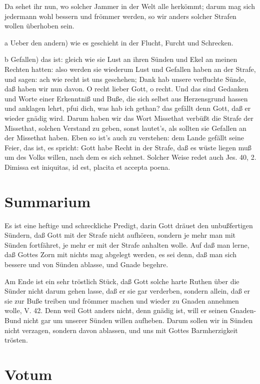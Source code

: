 Da sehet ihr nun, wo solcher Jammer in der Welt alle herkömmt; darum mag sich jedermann wohl bessern und frömmer werden, so wir anders solcher Strafen wollen überhoben sein.

a Ueber den andern) wie es geschieht in der Flucht, Furcht und Schrecken.

b Gefallen) das ist: gleich wie sie Lust an ihren Sünden und Ekel an meinen Rechten hatten: also werden sie wiederum Lust und Gefallen haben an der Strafe, und sagen: ach wie recht ist uns geschehen; Dank hab unsere verfluchte Sünde, daß haben wir nun davon. O recht lieber Gott, o recht. Und das sind Gedanken und Worte einer Erkenntniß und Buße, die sich selbst aus Herzensgrund hassen und anklagen lehrt, pfui dich, was hab ich gethan? das gefällt denn Gott, daß er wieder gnädig wird. Darum haben wir das Wort Missethat verbüßt die Strafe der Missethat, solchen Verstand zu geben, sonst lautet's, als sollten sie Gefallen an der Missethat haben. Eben so ist's auch zu verstehen: dem Lande gefällt seine Feier, das ist, es spricht: Gott habe Recht in der Strafe, daß es wüste liegen muß um des Volks willen, nach dem es sich sehnet. Solcher Weise redet auch Jes. 40, 2. Dimissa est iniquitas, id est, placita et accepta poena.

\section{Summarium}

Es ist eine heftige und schreckliche Predigt, darin Gott dräuet den unbußfertigen Sündern, daß Gott mit der Strafe nicht aufhören, sondern je mehr man mit Sünden fortfähret, je mehr er mit der Strafe anhalten wolle. Auf daß man lerne, daß Gottes Zorn mit nichts mag abgelegt werden, es sei denn, daß man sich bessere und von Sünden ablasse, und Gnade begehre.

Am Ende ist ein sehr tröstlich Stück, daß Gott solche harte Ruthen über die Sünder nicht darum gehen lasse, daß er sie gar verderben, sondern allein, daß er sie zur Buße treiben und frömmer machen und wieder zu Gnaden annehmen wolle, V. 42. Denn weil Gott anders nicht, denn gnädig ist, will er seinen Gnaden-Bund nicht gar um unserer Sünden willen aufheben. Darum sollen wir in Sünden nicht verzagen, sondern davon ablassen, und uns mit Gottes Barmherzigkeit trösten.

\section{Votum}

